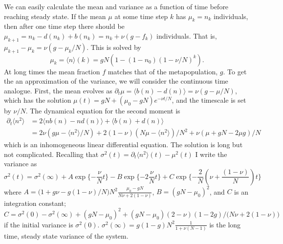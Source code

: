 We can easily calculate the mean and variance as a function of time before reaching steady state. 
If the mean $\mu$ at some time step $k$ has $\mu_k=n_k$ individuals, then after one time step there should be $\mu_{k+1}= n_k - d(n_k) + b(n_k) = n_k + \nu(g-f_k)$ individuals. 
That is, $\mu_{k+1}-\mu_k = \nu(g-\mu_k/N)$. 
This is solved by 
\begin{equation*}
 \mu_k = \langle n\rangle(k) = g N \left( 1 - (1-n_0)(1-\nu/N)^k\right).
\end{equation*}
At long times the mean fraction $f$ matches that of the metapopulation, $g$. 
To get the an approximation of the variance, we will consider the continuous time analogue. 
First, the mean evolves as $\partial_t\mu = \langle b(n)-d(n)\rangle = \nu\left(g-\mu/N\right)$, which has the solution $\mu(t) = g N  + (\mu_0-g N)e^{-\nu t/N}$, and the timescale is set by $\nu/N$. 
The dynamical equation for the second moment is
\begin{align*}
 \partial_t\langle n^2\rangle &= 2\langle n b(n) - n d(n)\rangle + \langle b(n) + d(n)\rangle \\
                              &= 2\nu \left( g \mu - \langle n^2\rangle/N\right) + 2(1-\nu)\left(N\mu-\langle n^2\rangle\right)/N^2 + \nu(\mu + g N - 2 \mu g)/N
\end{align*}
which is an inhomogeneous linear differential equation. 
The solution is long but not complicated. 
Recalling that $\sigma^2(t) = \partial_t\langle n^2\rangle(t) - \mu^2(t)$ I write the variance as
\begin{equation*}
 \sigma^2(t) = \sigma^2(\infty) + A\exp\{-\frac{\nu}{N}t\} - B\exp\{-2\frac{\nu}{N}t\} + C\exp\{-\frac{2}{N}\left(\nu+\frac{(1-\nu)}{N}\right)t\}
\end{equation*}
where $A=\big(1+g\nu-g(1-\nu)/N\big)N^2\frac{\mu_0-gN}{N\nu+2(1-\nu)}$, $B=(gN-\mu_0)^2$, and $C$ is an integration constant; $C = \sigma^2(0) - \sigma^2(\infty) + (gN-\mu_0)^2 + (gN-\mu_0)(2-\nu)(1-2g)/\big(N\nu+2(1-\nu)\big)$ if the initial variance is $\sigma^2(0)$. 
$\sigma^2(\infty) = g(1-g) N^2\frac{1}{1+\nu(N-1)}$ is the long time, steady state variance of the system. 

